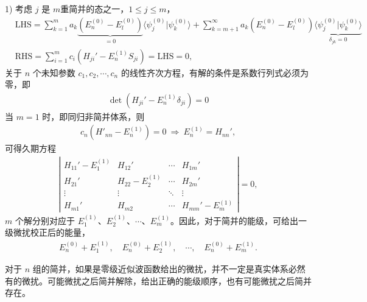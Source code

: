 1) 考虑 $j$ 是 $m$重简并的态之一，$1 \leqslant j \leqslant m$，
\begin{align}
    &\text{LHS} = 
    \sum_{k=1}^m a_k 
    \underbrace{(E_n^{(0)} - E_l^{(0)})}_{=0}
    \langle \psi_j^{(0)} | \psi_k^{(0)} \rangle
    +
    \sum_{k=m+1}^\infty a_k 
    (E_n^{(0)} - E_l^{(0)})
    \underbrace{\langle \psi_j^{(0)} | \psi_k^{(0)} \rangle}_{\delta_{jk}=0}
    \\
    &\text{RHS} = \sum_{i=1}^{m} c_i (H_{ji}' - E_n^{(1)}S_{ji}) = \text{LHS} = 0,
\end{align}
关于 $n$ 个未知参数 $c_1, c_2, \cdots, c_n$ 的线性齐次方程，有解的条件是系数行列式必须为零，即
\begin{align}
    \det\left(H_{ji}' - E_n^{(1)} \delta_{ji}\right) = 0
\end{align}
当 $m = 1$ 时，即同归非简并体系，则
\begin{align}
    c_n (H'_{nn} - E_n^{(1)}) = 0 \ \Rightarrow \ E_n^{(1)} = H_{nn}', 
\end{align}
可得久期方程
\begin{align}
    \left|\begin{matrix}
        H_{11}' - E_1^{(1)} & H_{12}' & \cdots & H_{1m}' \\
        H_{21}' & H_{22} - E_2^{(1)} & \cdots & H_{2m}' \\
        \vdots & \vdots & \ddots & \vdots \\
        H_{m1}' & H_{m2} & \cdots & H_{mm}' - E_m^{(1)}
    \end{matrix}
    \right|=0,
\end{align}
$m$ 个解分别对应于 $E_1^{(1)}$、$E_2^{(1)}$、$\cdots$、$E_m^{(1)}$。因此，对于简并的能级，可给出一级微扰校正后的能量，
\begin{align}
    E_n^{(0)}+E_1^{(1)}, \quad E_n^{(0)}+E_2^{(1)}, \quad\cdots,\quad E_n^{(0)}+E_m^{(1)}. 
\end{align}

对于 $n$ 组的简并，如果是零级近似波函数给出的微扰，并不一定是真实体系必然有的微扰。可能微扰之后简并解除，给出正确的能级顺序，也有可能微扰之后简并存在。

